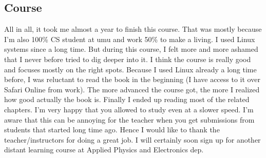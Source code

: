 \documentclass[a4paper,11pt,twoside]{article}
\begin{document}
\subsection{Course}
All in all, it took me almost a year to finish this course. That was mostly because
I'm also 100\% CS student at umu and work 50\% to make a living. I used Linux systems
since a long time. But during this course, I felt more and more ashamed that I never
before tried to dig deeper into it. I think the course is really good and focuses
mostly on the right spots. Because I used Linux already a long time before, I was
reluctant to read the book in the beginning (I have access to it over Safari Online
from work). The more advanced the course got, the more I realized how good actually
the book is. Finally I ended up reading most of the related chapters. I'm very
happy that you allowed to study even at a slower speed. I'm aware that this can be
annoying for the teacher when you get submissions from students that started long
time ago. Hence I would like to thank the teacher/instructors for doing a great
job. I will certainly soon sign up for another distant learning course at
Applied Physics and Electronics dep.


\end{document}

